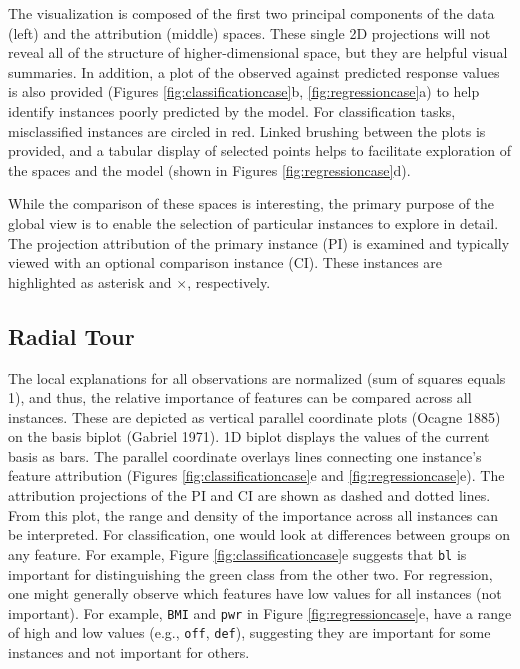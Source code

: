 \documentclass[11pt,twoside]{article}
\begin{document}
The visualization is composed of the first two principal components of the data (left) and the attribution (middle) spaces. These single 2D projections will not reveal all of the structure of higher-dimensional space, but they are helpful visual summaries. In addition, a plot of the observed against predicted response values is also provided (Figures \ref{fig:classificationcase}b, \ref{fig:regressioncase}a) to help identify instances poorly predicted by the model. For classification tasks, misclassified instances are circled in red. Linked brushing between the plots is provided, and a tabular display of selected points helps to facilitate exploration of the spaces and the model (shown in Figures \ref{fig:regressioncase}d).

While the comparison of these spaces is interesting, the primary purpose of the global view is to enable the selection of particular instances to explore in detail. The projection attribution of the primary instance (PI) is examined and typically viewed with an optional comparison instance (CI). These instances are highlighted as asterisk and \(\times\), respectively.

\hypertarget{radial-tour}{%
\subsection{Radial Tour}\label{radial-tour}}

The local explanations for all observations are normalized (sum of squares equals 1), and thus, the relative importance of features can be compared across all instances. These are depicted as vertical parallel coordinate plots (Ocagne 1885) on the basis biplot (Gabriel 1971). 1D biplot displays the values of the current basis as bars. The parallel coordinate overlays lines connecting one instance's feature attribution (Figures \ref{fig:classificationcase}e and \ref{fig:regressioncase}e). The attribution projections of the PI and CI are shown as dashed and dotted lines. From this plot, the range and density of the importance across all instances can be interpreted. For classification, one would look at differences between groups on any feature. For example, Figure \ref{fig:classificationcase}e suggests that \texttt{bl} is important for distinguishing the green class from the other two. For regression, one might generally observe which features have low values for all instances (not important). For example, \texttt{BMI} and \texttt{pwr} in Figure \ref{fig:regressioncase}e, have a range of high and low values (e.g., \texttt{off}, \texttt{def}), suggesting they are important for some instances and not important for others.
\end{document}
